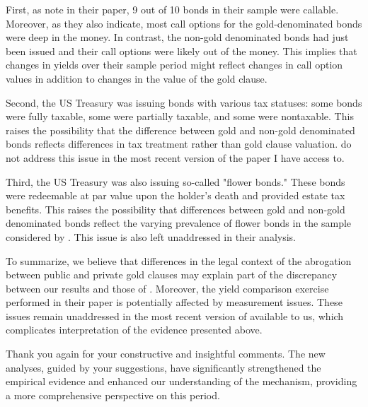 First, as \cite{Edwards2015} note in their paper, 9 out of 10 bonds in their sample were callable. Moreover, as they also indicate, most call options for the gold-denominated bonds were deep in the money. In contrast, the non-gold denominated bonds had just been issued and their call options were likely out of the money. This implies that changes in yields over their sample period might reflect changes in call option values in addition to changes in the value of the gold clause.

Second, the US Treasury was issuing bonds with various tax statuses: some bonds were fully taxable, some were partially taxable, and some were nontaxable. This raises the possibility that the difference between gold and non-gold denominated bonds reflects differences in tax treatment rather than gold clause valuation. \cite{Edwards2015} do not address this issue in the most recent version of the paper I have access to.

Third, the US Treasury was also issuing so-called "flower bonds." These bonds were redeemable at par value upon the holder's death and provided estate tax benefits. This raises the possibility that differences between gold and non-gold denominated bonds reflect the varying prevalence of flower bonds in the sample considered by \cite{Edwards2015}. This issue is also left unaddressed in their analysis.

To summarize, we believe that differences in the legal context of the abrogation between public and private gold clauses may explain part of the discrepancy between our results and those of \cite{Edwards2015}. Moreover, the yield comparison exercise performed in their paper is potentially affected by measurement issues. These issues remain unaddressed in the most recent version of \cite{Edwards2015} available to us, which complicates interpretation of the evidence presented above.

Thank you again for your constructive and insightful comments. The new analyses, guided by your suggestions, have significantly strengthened the empirical evidence and enhanced our understanding of the mechanism, providing a more comprehensive perspective on this period.
